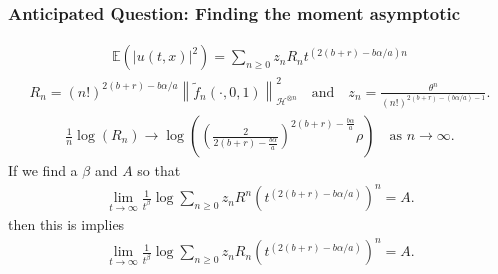 \documentclass{beamer}%
\numberwithin{equation}{section}
\newcommand{\Norm}[1]{\left\|  #1   \right\|}
\begin{document}
	\begin{frame}[t]
		\frametitle{Anticipated Question: Finding the moment asymptotic}
		\begin{align*}
		\mathbb{E}(|u(t,x)|^2) = \sum_{n \ge 0} z_n R_nt^{(2(b+r)-b\alpha/a)n}
		\end{align*}
		\begin{align*}
		R_n = (n!)^{2(b+r)-b\alpha/a}\Norm{\widetilde{f}_n(\cdot,0,1)}_{\mathcal{H}^{\otimes n}}^2 \quad \text{and} \quad
		z_n = \frac{\theta^n}{(n!)^{2(b+r)-(b\alpha/a)-1}}.
		\end{align*}
		\begin{align*}
		\frac{1}{n}\log(R_n) \to  \log\left( \left(\frac{2}{2(b+r)-\frac{b\alpha}{a}}\right)^{2(b+r)-\frac{b\alpha}{a}}  \rho \right )  \quad \text{as } n\to \infty.
		\end{align*}
		If we find a $\beta$ and $A$ so that
		\begin{align*}
		\lim_{t \to \infty}\frac{1}{t^\beta} \log \sum_{n \ge 0} z_n R^n \left(t^{(2(b+r)-b\alpha/a)}\right)^n = A.
		\end{align*}
		then this is implies
		\begin{align*}
		\lim_{t \to \infty}\frac{1}{t^\beta} \log \sum_{n \ge 0} z_n R_n \left(t^{(2(b+r)-b\alpha/a)}\right)^n = A.
		\end{align*}
	\end{frame}
\end{document}
